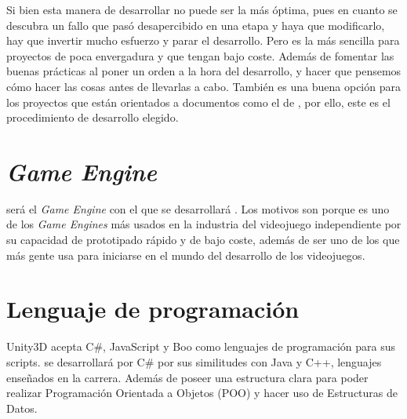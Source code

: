     Si bien esta manera de desarrollar no puede ser la más óptima, pues en cuanto se descubra un fallo que pasó desapercibido en una etapa y haya que modificarlo, hay que invertir mucho esfuerzo y parar el desarrollo. Pero es la más sencilla para proyectos de poca envergadura y que tengan bajo coste. Además de fomentar las buenas prácticas al poner un orden a la hora del desarrollo, y hacer que pensemos cómo hacer las cosas antes de llevarlas a cabo. También es una buena opción para los proyectos que están orientados a documentos como el de \nombrejuego, por ello, este es el procedimiento de desarrollo elegido. 
    
    \section{\emph{Game Engine}}
     será el \emph{Game Engine} con el que se desarrollará \nombrejuego. Los motivos son porque es uno de los \emph{Game Engines} más usados en la industria del videojuego independiente por su capacidad de prototipado rápido y de bajo coste, además de ser uno de los que más gente usa para iniciarse en el mundo del desarrollo de los videojuegos. 
    
    \section{Lenguaje de programación}
    Unity3D acepta C\#, JavaScript y Boo como lenguajes de programación para sus scripts. \nombrejuego se desarrollará por C\# por sus similitudes con Java y C++, lenguajes enseñados en la carrera. Además de poseer una estructura clara para poder realizar Programación Orientada a Objetos (POO) y hacer uso de Estructuras de Datos. 
